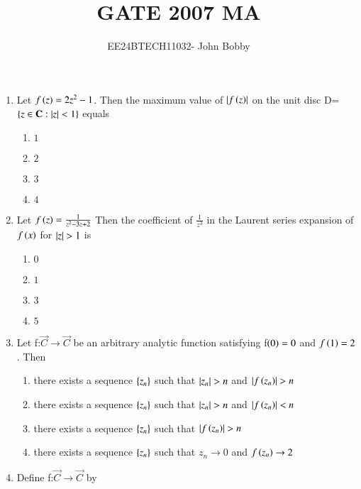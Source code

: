 \documentclass[journal,12pt,onecolumn]{IEEEtran}
\theoremstyle{remark}
\begin{document}

\vspace{3cm}

\title{\textbf{GATE 2007 MA}}
\author{EE24BTECH11032- John Bobby}
\maketitle
\bigskip

\renewcommand{\thefigure}{\theenumi}
\renewcommand{\thetable}{\theenumi}
\setlength{\columnsep}{2.5em}
\begin{enumerate}
    \item Let $f\left(z\right)=2z^2-1$. Then the maximum value of $\left\vert f\left(z\right)\right\vert$ on the unit disc D=$\left\{z \in \mathbf{C}:\left\vert z\right\vert<1\right\}$ equals
    \begin{enumerate}
        \item $1$
        \item $2$
        \item $3$
        \item $4$
    \end{enumerate}
    \item Let $f\left(z\right)=\frac{1}{z^2-3z+2}$ Then the coefficient of $\frac{1}{z^3}$ in the Laurent series expansion of $f\left(x\right)$ for $\left\vert z\right\vert>1$ is 
    \begin{enumerate}
        \item $0$
        \item $1$
        \item $3$
        \item $5$
    \end{enumerate}
    \item Let f:$\vec{C} \to \vec{C}$ be an arbitrary analytic function satisfying f$\left(0\right)=0$ and $f\left(1\right)=2$. Then
    \begin{enumerate}
        \item there exists a sequence $\left\{z_n\right\}$ such that $\left\vert z_n\right\vert>n$ and $\left\vert f\left(z_n\right)\right\vert>n$
        \item there exists a sequence $\left\{z_n\right\}$ such that $\left\vert z_n\right\vert>n$ and $\left\vert f\left(z_n\right)\right\vert<n$
        \item there exists a sequence $\left\{z_n\right\}$ such that $\left\vert f\left(z_n\right)\right\vert>n$
        \item there exists a sequence $\left\{z_n\right\}$ such that $z_n \to 0$ and $f\left(z_n\right) \to 2$
    \end{enumerate}
    \item Define f:$\vec{C} \to \vec{C}$ by \\

\end{enumerate}
\end{document}
